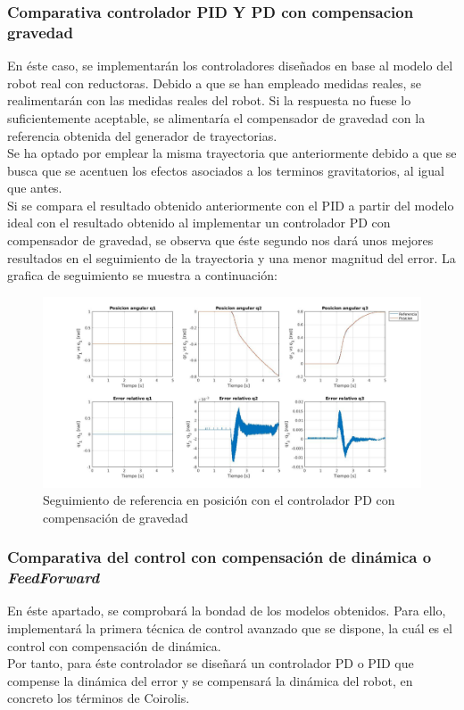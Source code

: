 \subsubsection{Comparativa controlador PID Y PD con compensacion gravedad}
En éste caso, se implementarán los controladores diseñados en base al modelo del robot real con reductoras. Debido a que se han empleado medidas reales, se realimentarán con las medidas reales del robot. Si la respuesta no fuese lo suficientemente aceptable, se alimentaría el compensador de gravedad con la referencia obtenida del generador de trayectorias. \\
Se ha optado por emplear la misma trayectoria que anteriormente debido a que se busca que se acentuen los efectos asociados a los terminos gravitatorios, al igual que antes.\\
Si se compara el resultado obtenido anteriormente con el PID a partir del modelo ideal con el resultado obtenido al implementar un controlador PD con compensador de gravedad, se observa que éste segundo nos dará unos mejores resultados en el seguimiento de la trayectoria y una menor magnitud del error. La grafica de seguimiento se muestra a continuación:

\begin{figure}[h!]
	\centering
	\includegraphics[width=.8\textwidth]{exp2_posPDcomp}
	\caption{Seguimiento de referencia en posición con el controlador PD con compensación de gravedad}
\end{figure}


\subsubsection{Comparativa del control con compensación de dinámica o \textit{FeedForward}}
En éste apartado, se comprobará la bondad de los modelos obtenidos. Para ello, implementará la primera técnica de control avanzado que se dispone, la cuál es el control con compensación de dinámica.\\
Por tanto, para éste controlador se diseñará un controlador PD o PID que compense la dinámica del error y se compensará la dinámica del robot, en concreto los términos de Coirolis.\\


